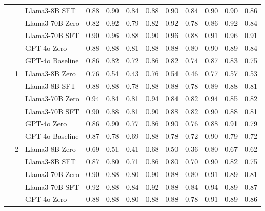 \begin{longtable}[t]{ll>{}l|rr>{}r|rr>{}r|rrr}
 &  & Llama3-8B SFT & 0.88 & 0.90 & 0.84 & 0.88 & 0.90 & 0.84 & 0.90 & 0.90 & 0.86\\

 &  & Llama3-70B Zero & 0.82 & 0.92 & 0.79 & 0.82 & 0.92 & 0.78 & 0.86 & 0.92 & 0.84\\

 &  & Llama3-70B SFT & 0.90 & 0.96 & 0.88 & 0.90 & 0.96 & 0.88 & 0.91 & 0.96 & 0.91\\

 &  & GPT-4o Zero & 0.88 & 0.88 & 0.81 & 0.88 & 0.88 & 0.80 & 0.90 & 0.89 & 0.84\\

 &  & GPT-4o Baseline & 0.86 & 0.82 & 0.72 & 0.86 & 0.82 & 0.74 & 0.87 & 0.83 & 0.75\\
\cmidrule{2-12}
 & 1 & Llama3-8B Zero & 0.76 & 0.54 & 0.43 & 0.76 & 0.54 & 0.46 & 0.77 & 0.57 & 0.53\\

 &  & Llama3-8B SFT & 0.88 & 0.88 & 0.78 & 0.88 & 0.88 & 0.78 & 0.89 & 0.88 & 0.81\\

 &  & Llama3-70B Zero & 0.94 & 0.84 & 0.81 & 0.94 & 0.84 & 0.82 & 0.94 & 0.85 & 0.82\\

 &  & Llama3-70B SFT & 0.90 & 0.88 & 0.81 & 0.90 & 0.88 & 0.82 & 0.90 & 0.88 & 0.81\\

 &  & GPT-4o Zero & 0.86 & 0.90 & 0.77 & 0.86 & 0.90 & 0.76 & 0.88 & 0.91 & 0.79\\

 &  & GPT-4o Baseline & 0.87 & 0.78 & 0.69 & 0.88 & 0.78 & 0.72 & 0.90 & 0.79 & 0.72\\
\cmidrule{2-12}
 & 2 & Llama3-8B Zero & 0.69 & 0.51 & 0.41 & 0.68 & 0.50 & 0.36 & 0.80 & 0.67 & 0.62\\

 &  & Llama3-8B SFT & 0.87 & 0.80 & 0.71 & 0.86 & 0.80 & 0.70 & 0.90 & 0.82 & 0.75\\

 &  & Llama3-70B Zero & 0.90 & 0.88 & 0.80 & 0.90 & 0.88 & 0.80 & 0.91 & 0.89 & 0.81\\

 &  & Llama3-70B SFT & 0.92 & 0.88 & 0.84 & 0.92 & 0.88 & 0.84 & 0.94 & 0.89 & 0.87\\

 &  & GPT-4o Zero & 0.88 & 0.88 & 0.80 & 0.88 & 0.88 & 0.78 & 0.91 & 0.89 & 0.86\\


\end{longtable}
